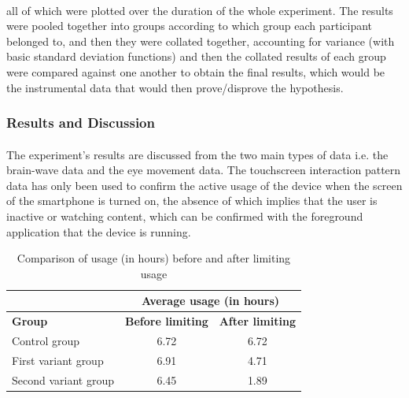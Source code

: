 \documentclass{article}
\begin{document}
\paragraph{} all of which were plotted over the duration of the whole experiment. The results were pooled together into groups according to which group each participant belonged to, and then they were collated together, accounting for variance (with basic standard deviation functions) and then the collated results of each group were compared against one another to obtain the final results, which would be the instrumental data that would then prove/disprove the hypothesis.

\subsubsection{Results and Discussion}

\paragraph{} The experiment's results are discussed from the two main types of data i.e. the brain-wave data and the eye movement data. The touchscreen interaction pattern data has only been used to confirm the active usage of the device when the screen of the smartphone is turned on, the absence of which implies that the user is inactive or watching content, which can be confirmed with the foreground application that the device is running.

\begin{table}[hbtp]
  \begin{center}
    \begin{tabular}{|l|c|c|}
    \hline
                         & \multicolumn{2}{c|}{\textbf{Average usage (in hours)}}      \\ \hline
    \textbf{Group}       & \textbf{Before limiting}        & \textbf{After limiting}   \\ \hline
    Control group        & 6.72                   & 6.72                               \\ \hline
    First variant group  & 6.91                   & 4.71                               \\ \hline
    Second variant group & 6.45                   & 1.89                               \\ \hline
    \end{tabular}
    \caption{Comparison of usage (in hours) before and after limiting usage}
    \label{tab:tabone}
  \end{center}
\end{table}
\end{document}
